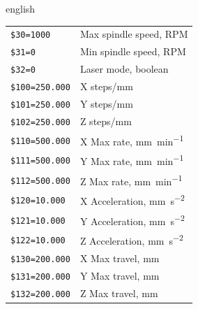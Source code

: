 \begin{table}[H]
\begin{otherlanguage*}{english}
\begin{tabular}{ll}
            \verb|$30=1000|             & Max spindle speed, RPM \\
            \verb|$31=0|                & Min spindle speed, RPM \\
            \verb|$32=0|                & Laser mode, boolean \\
            \verb|$100=250.000|         & X steps/mm \\
            \verb|$101=250.000|         & Y steps/mm \\
            \verb|$102=250.000|         & Z steps/mm \\
            \verb|$110=500.000|         & X Max rate, \si{\milli\meter\per\minute} \\
            \verb|$111=500.000|         & Y Max rate, \si{\milli\meter\per\minute} \\
            \verb|$112=500.000|         & Z Max rate, \si{\milli\meter\per\minute} \\
            \verb|$120=10.000|          & X Acceleration, \si{\milli\meter\per\second\squared} \\
            \verb|$121=10.000|          & Y Acceleration, \si{\milli\meter\per\second\squared} \\
            \verb|$122=10.000|          & Z Acceleration, \si{\milli\meter\per\second\squared} \\
            \verb|$130=200.000|         & X Max travel, \si{\milli\meter} \\
            \verb|$131=200.000|         & Y Max travel, \si{\milli\meter} \\
            \verb|$132=200.000|         & Z Max travel, \si{\milli\meter} \\
            \bottomrule
        \end{tabular}
    \end{otherlanguage*}
\end{table}



\clearpage
{}
\label{app:update ha}




\clearpage



